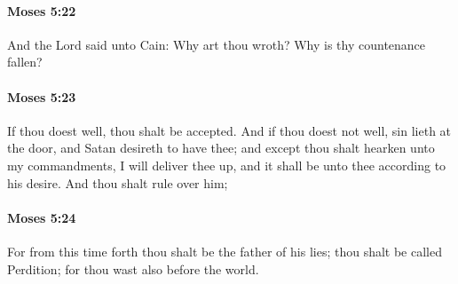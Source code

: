 		\paragraph{Moses 5:22} %
			\label{MOSES-5-22}

			And the Lord said unto Cain: Why art thou wroth? Why is thy countenance fallen?


		\paragraph{Moses 5:23} %
			\label{MOSES-5-23}

			If thou doest well, thou shalt be accepted. And if thou doest not well, sin lieth at the door, and Satan desireth to have thee; and except thou shalt hearken unto my commandments, I will deliver thee up, and it shall be unto thee according to his desire. And thou shalt rule over him;


		\paragraph{Moses 5:24} %
			\label{MOSES-5-24}

			For from this time forth thou shalt be the father of his lies; thou shalt be called Perdition; for thou wast also before the world.


